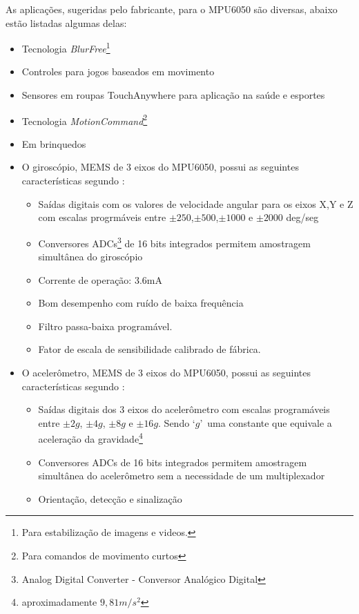 	As aplicações, sugeridas pelo fabricante, para o MPU6050 são diversas, abaixo estão listadas algumas delas:
	\begin{itemize}
		\item Tecnologia \textit{ BlurFree\texttrademark }\footnote{Para estabilização de imagens e videos.}
		\item Controles para jogos baseados em movimento
		\item Sensores em roupas TouchAnywhere para aplicação na saúde e esportes
		\item Tecnologia \textit{ MotionCommand\texttrademark}\footnote{Para comandos de movimento curtos} 
		\item Em brinquedos
	\end{itemize}
	
	\begin{description}
		\item[Características do MPU6050] 
		\item \begin{itemize} 
			\item  O giroscópio, MEMS de 3 eixos do MPU6050, possui as seguintes características segundo \cite{mpu6050}:
			\begin{itemize}
				\item Saídas digitais com os valores de velocidade angular para os eixos X,Y e Z com escalas progrmáveis entre $ \pm250 $,$ \pm500 $,$ \pm1000 $ e $ \pm 2000$ deg/seg
				\item Conversores ADCs\footnote{Analog Digital Converter - Conversor Analógico Digital} de 16 bits integrados permitem amostragem simultânea do giroscópio
				\item Corrente de operação: 3.6mA
				\item Bom desempenho com ruído de baixa frequência
				\item Filtro passa-baixa programável.
				\item Fator de escala de sensibilidade calibrado de fábrica.
			\end{itemize}
			\item O acelerômetro, MEMS de 3 eixos do MPU6050, possui as seguintes características segundo \cite{mpu6050}:\begin{itemize}
				\item Saídas digitais dos 3 eixos do acelerômetro com escalas programáveis entre $\pm2g$, $\pm4g$, $\pm8g$ e $\pm16g$. Sendo \textquoteleft$ g$\textquoteright \ uma constante que equivale a aceleração da gravidade\footnote{aproximadamente $9,81 m/s^2 $}
				\item Conversores ADCs de 16 bits integrados permitem amostragem simultânea do acelerômetro sem a necessidade de um multiplexador
				\item Orientação, detecção e sinalização
				
			\end{itemize}
		\end{itemize}
	\end{description}
	
